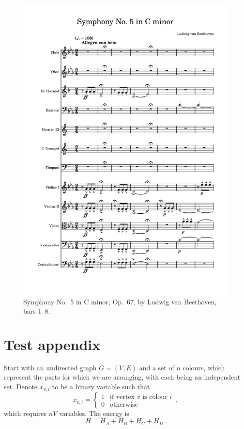 \documentclass[12pt]{article}
\theoremstyle{definition}
\begin{document}
\begin{figure}
    \includegraphics[width=\textwidth,page=1]{beethoven-op67.pdf}
    \caption{Symphony No.\ 5 in C minor, Op.\ 67, by Ludwig van Beethoven, bars 1--8.}
\end{figure}

\section{Test appendix}

Start with an undirected graph $G=(V,E)$ and a set of $n$ colours, which represent the parts for which we are arranging, with each being an independent set. Denote $x_{v,i}$ to be a binary variable such that
\begin{equation*}
    x_{v,i} =
    \begin{cases}
        1 & \text{if vertex $v$ is colour $i$} \\
        0 & \text{otherwise}
    \end{cases}
    \,,
\end{equation*}
which requires $nV$ variables. The energy is
\begin{equation*}
    H = H_A + H_B + H_C + H_D \,.
\end{equation*}
\end{document}
